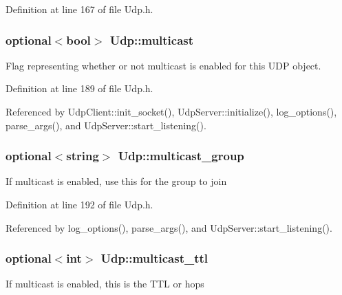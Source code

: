 Definition at line 167 of file Udp.h.

\hypertarget{classUdp_aff2511b739bdeee2875c07305b364042}{
\subsubsection[{multicast}]{\setlength{\rightskip}{0pt plus 5cm}optional$<$bool$>$ {\bf Udp::multicast}}}
\label{classUdp_aff2511b739bdeee2875c07305b364042}
Flag representing whether or not multicast is enabled for this UDP object. 

Definition at line 189 of file Udp.h.



Referenced by UdpClient::init\_\-socket(), UdpServer::initialize(), log\_\-options(), parse\_\-args(), and UdpServer::start\_\-listening().

\hypertarget{classUdp_a012f2fbbab10ad7112b6c727e6951207}{
\subsubsection[{multicast\_\-group}]{\setlength{\rightskip}{0pt plus 5cm}optional$<$string$>$ {\bf Udp::multicast\_\-group}}}
\label{classUdp_a012f2fbbab10ad7112b6c727e6951207}
If multicast is enabled, use this for the group to join 

Definition at line 192 of file Udp.h.



Referenced by log\_\-options(), parse\_\-args(), and UdpServer::start\_\-listening().

\hypertarget{classUdp_a11f39b2d209d628bdb52ff461e5898d2}{
\subsubsection[{multicast\_\-ttl}]{\setlength{\rightskip}{0pt plus 5cm}optional$<$int$>$ {\bf Udp::multicast\_\-ttl}}}
\label{classUdp_a11f39b2d209d628bdb52ff461e5898d2}
If multicast is enabled, this is the TTL or hops 

